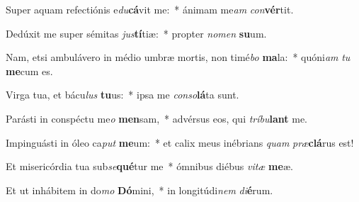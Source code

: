 \item Super aquam refectiónis e\textit{du}\textbf{cá}vit me:~* ánimam me\textit{am} \textit{con}\textbf{vér}tit.
\item Dedúxit me super sémitas \textit{jus}\textbf{tí}tiæ:~* propter \textit{no}\textit{men} \textbf{su}um.
\item Nam, etsi ambulávero in médio umbræ mortis, non timé\textit{bo} \textbf{ma}la:~* quóni\textit{am} \textit{tu} \textbf{me}cum es.
\item Virga tua, et bácu\textit{lus} \textbf{tu}us:~* ipsa me \textit{con}\textit{so}\textbf{lá}ta sunt.
\item Parásti in conspéctu me\textit{o} \textbf{men}sam,~* advérsus eos, qui \textit{trí}\textit{bu}\textbf{lant} me.
\item Impinguásti in óleo ca\textit{put} \textbf{me}um:~* et calix meus inébrians \textit{quam} \textit{præ}\textbf{clá}rus est!
\item Et misericórdia tua sub\textit{se}\textbf{qué}tur me~* ómnibus diébus \textit{vi}\textit{tæ} \textbf{me}æ.
\item Et ut inhábitem in do\textit{mo} \textbf{Dó}mini,~* in longitúdi\textit{nem} \textit{di}\textbf{é}rum.

